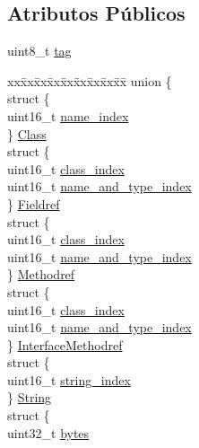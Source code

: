\subsection*{Atributos Públicos}
\begin{DoxyCompactItemize}
\item 
uint8\+\_\+t \hyperlink{class_cp_info_ac20d96c33f871bde2e903708a215a2dc}{tag}
\item 
\begin{tabbing}
xx\=xx\=xx\=xx\=xx\=xx\=xx\=xx\=xx\=\kill
union \{\\
\>struct \{\\
\>\>uint16\_t \hyperlink{class_cp_info_a8337463c52221eaead88f232ded768a7}{name\_index}\\
\>\} \hyperlink{class_cp_info_a8e42eb58082f93477cecc14d96c50689}{Class}\\
\>struct \{\\
\>\>uint16\_t \hyperlink{class_cp_info_abde12c60f120eb082631fd0554fbe2f3}{class\_index}\\
\>\>uint16\_t \hyperlink{class_cp_info_a3007bcc993f983836f419c3d8f8cb835}{name\_and\_type\_index}\\
\>\} \hyperlink{class_cp_info_a9f594a9412a1d3bfc086efc127fb528a}{Fieldref}\\
\>struct \{\\
\>\>uint16\_t \hyperlink{class_cp_info_abde12c60f120eb082631fd0554fbe2f3}{class\_index}\\
\>\>uint16\_t \hyperlink{class_cp_info_a3007bcc993f983836f419c3d8f8cb835}{name\_and\_type\_index}\\
\>\} \hyperlink{class_cp_info_ac86976e076271c25fb990d34cbf93eb1}{Methodref}\\
\>struct \{\\
\>\>uint16\_t \hyperlink{class_cp_info_abde12c60f120eb082631fd0554fbe2f3}{class\_index}\\
\>\>uint16\_t \hyperlink{class_cp_info_a3007bcc993f983836f419c3d8f8cb835}{name\_and\_type\_index}\\
\>\} \hyperlink{class_cp_info_ad489482113b9905436258696227b9d21}{InterfaceMethodref}\\
\>struct \{\\
\>\>uint16\_t \hyperlink{class_cp_info_a4b2f7aa4ac461ac4d860d566c5e3323e}{string\_index}\\
\>\} \hyperlink{class_cp_info_a9e47b825b6e22ad57a9b78cf430cd6bc}{String}\\
\>struct \{\\
\>\>uint32\_t \hyperlink{class_cp_info_aff3858879ad5feb452a5fc0504e99c1b}{bytes}\\

\end{tabbing}
\end{DoxyCompactItemize}
